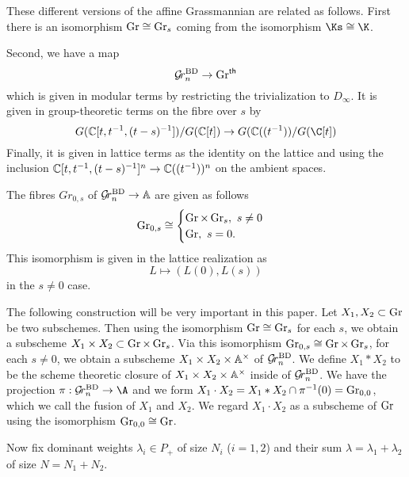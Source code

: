 \documentclass{article}
\newcommand{\Grth}{\Gr^{\sf th}}
\begin{document}
These different versions of the affine Grassmannian are related as follows.  First there is an isomorphism $ \Gr \cong \Gr_s $ coming from the isomorphism $ \Ks \cong \K$.

Second, we have a map $$ \Grbd \rightarrow \Grth $$ which is given in modular terms by restricting the trivialization to $ D_\infty$.  It is given in group-theoretic terms on the fibre over $ s $ by
$$
G(\CC[t, t^{-1}, (t-s)^{-1}])/ G(\CC[t]) \rightarrow G(\CC((t^{-1}))/G(\C[t])
$$
Finally, it is given in lattice terms as the identity on the lattice and using the inclusion $\CC[t, t^{-1}, (t-s)^{-1}]^n \rightarrow \CC((t^{-1}))^n$ on the ambient spaces.

The fibres $ Gr_{0,s}$ of $ \Grbd \rightarrow \AA$ are given as follows
$$
\Gr_{0,s} \cong \begin{cases} \Gr \times \Gr_s, \  s \ne 0 \\
\Gr, \ s = 0.
\end{cases}
$$
This isomorphism is given in the lattice realization as
$$
L \mapsto (L(0), L(s))
$$
in the $ s \ne 0 $ case.

The following construction will be very important in this paper.  Let $ X_1, X_2 \subset \Gr$ be two subschemes.  Then using the isomorphism $ \Gr \cong \Gr_s $ for each $ s$, we obtain a subscheme $ X_1 \times X_2 \subset \Gr \times \Gr_s $.  Via this isomorphism $ \Gr_{0,s} \cong \Gr \times \Gr_s $,  for each $ s \ne 0$, we obtain a subscheme $ X_1 \times X_2 \times \AA^\times $  of $\Grbd$.  We define $ X_1 * X_2 $ to be the scheme theoretic closure of $ X_1 \times X_2 \times \AA^\times $ inside of $ \Grbd $.  We have the projection $ \pi: \Grbd \rightarrow \A $ and we form $ X_1 \cdot X_2 = X_1 * X_2 \cap \pi^{-1}(0) = \Gr_{0,0} $, which we call the fusion of $ X_1 $ and $X_2$.  We regard $ X_1 \cdot X_2$ as a subscheme of $ \Gr $ using the isomorphism $\Gr_{0,0} \cong \Gr $.


Now fix dominant weights $ \lambda_i \in P_+$ of size $N_i$ ($i=1,2$) and their sum $ \lambda = \lambda_1 + \lambda_2$ of size $ N = N_1 + N_2$.
\end{document}
